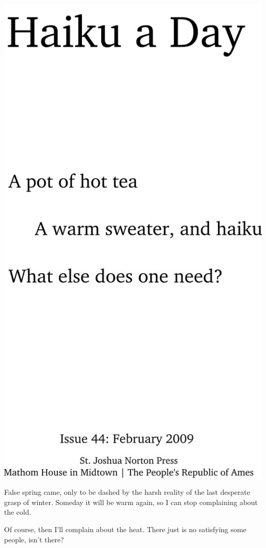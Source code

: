 \documentclass[12pt]{article}
\begin{document}
\includegraphics{frontpage.png}

\newpage

False spring came, only to be dashed by the harsh reality
of the last desperate grasp of winter. Someday it will be
warm again, so I can stop complaining about the cold.

Of course, then I'll complain about the heat. There just is
no satisfying some people, isn't there?
\end{document}
